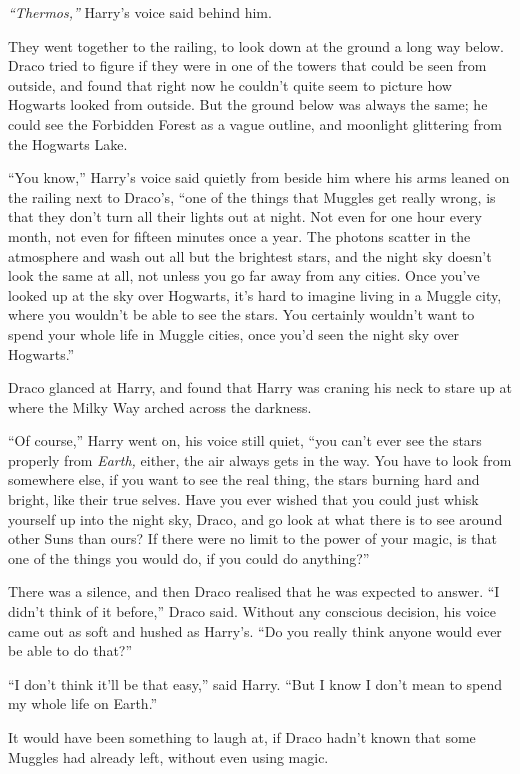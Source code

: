 \emph{``Thermos,''} Harry's voice said behind him.

They went together to the railing, to look down at the ground a long way
below. Draco tried to figure if they were in one of the towers that
could be seen from outside, and found that right now he couldn't quite
seem to picture how Hogwarts looked from outside. But the ground below
was always the same; he could see the Forbidden Forest as a vague
outline, and moonlight glittering from the Hogwarts Lake.

``You know,'' Harry's voice said quietly from beside him where his arms
leaned on the railing next to Draco's, ``one of the things that Muggles
get really wrong, is that they don't turn all their lights out at night.
Not even for one hour every month, not even for fifteen minutes once a
year. The photons scatter in the atmosphere and wash out all but the
brightest stars, and the night sky doesn't look the same at all, not
unless you go far away from any cities. Once you've looked up at the sky
over Hogwarts, it's hard to imagine living in a Muggle city, where you
wouldn't be able to see the stars. You certainly wouldn't want to spend
your whole life in Muggle cities, once you'd seen the night sky over
Hogwarts.''

Draco glanced at Harry, and found that Harry was craning his neck to
stare up at where the Milky Way arched across the darkness.

``Of course,'' Harry went on, his voice still quiet, ``you can't ever
see the stars properly from \emph{Earth,} either, the air always gets in
the way. You have to look from somewhere else, if you want to see the
real thing, the stars burning hard and bright, like their true selves.
Have you ever wished that you could just whisk yourself up into the
night sky, Draco, and go look at what there is to see around other Suns
than ours? If there were no limit to the power of your magic, is that
one of the things you would do, if you could do anything?''

There was a silence, and then Draco realised that he was expected to
answer. ``I didn't think of it before,'' Draco said. Without any
conscious decision, his voice came out as soft and hushed as Harry's.
``Do you really think anyone would ever be able to do that?''

``I don't think it'll be that easy,'' said Harry. ``But I know I don't
mean to spend my whole life on Earth.''

It would have been something to laugh at, if Draco hadn't known that
some Muggles had already left, without even using magic.

